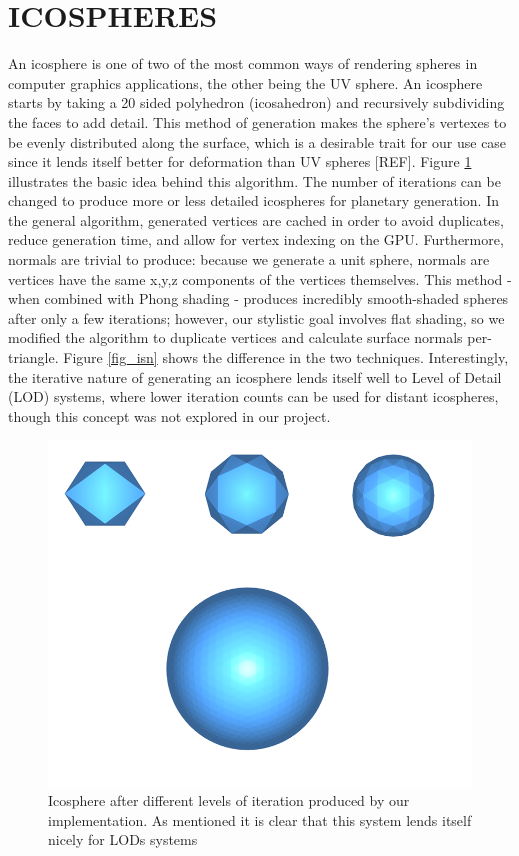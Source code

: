 \documentclass[a4paper,twoside]{article}
\begin{document}
\section{\uppercase{IcoSpheres}}
\label{sec:icosphere}
\noindent An icosphere is one of two of the most common ways of rendering spheres in computer graphics applications, the other being the UV sphere. An icosphere starts by taking a 20 sided polyhedron (icosahedron)  and recursively subdividing the faces to add detail. This method of generation makes the sphere's vertexes to be evenly distributed along the surface, which is a desirable trait for our use case since it lends itself better for deformation than UV spheres [REF]. Figure \ref{fig_isa} illustrates the basic idea behind this algorithm. The number of iterations can be changed to produce more or less detailed icospheres for planetary generation. In the general algorithm, generated vertices are cached in order to avoid duplicates, reduce generation time, and allow for vertex indexing on the GPU. Furthermore, normals are trivial to produce: because we generate a unit sphere, normals are vertices have the same x,y,z components of the vertices themselves. This method - when combined with Phong shading - produces incredibly smooth-shaded spheres after only a few iterations; however, our stylistic goal involves flat shading, so we modified the algorithm to duplicate vertices and calculate surface normals per-triangle. Figure \ref{fig_isn} shows the difference in the two techniques. Interestingly, the iterative nature of generating an icosphere lends itself well to Level of Detail (LOD) systems, where lower iteration counts can be used for distant icospheres, though this concept was not explored in our project.

\begin{figure}
\includegraphics[scale=0.24]{./images/icospheres/icosphereslod.png}
\caption{Icosphere after different levels of iteration produced by our implementation. As mentioned it is clear that this system lends itself nicely for LODs systems}
\label{fig_isa}
\end{figure}
\end{document}
